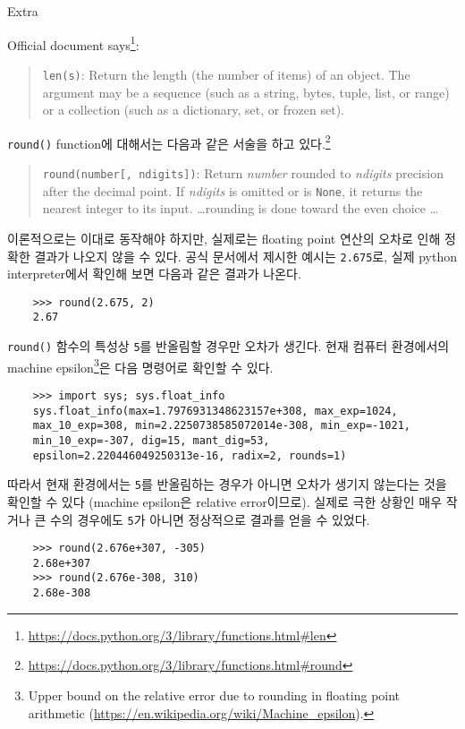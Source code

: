 \documentclass[a4paper,11pt]{scrartcl}
\begin{document}
\begin{labeling}{Extra}
  \item[Extra]
  Official document says\footnote{\url{https://docs.python.org/3/library/functions.html\#len}}:
  \begin{quotation}
    \lstinline{len(s)}: Return the length (the number of items) of an object. The argument may be a sequence (such as a string, bytes, tuple, list, or range) or a collection (such as a dictionary, set, or frozen set).
  \end{quotation}
  \lstinline{round()} function에 대해서는 다음과 같은 서술을 하고 있다.\footnote{\url{https://docs.python.org/3/library/functions.html\#round}}
  \begin{quotation}
    \lstinline{round(number[, ndigits])}: Return \emph{number} rounded to \emph{ndigits} precision after the decimal point. If \emph{ndigits} is omitted or is \lstinline{None}, it returns the nearest integer to its input. \dots rounding is done toward the even choice \dots
  \end{quotation}
  이론적으로는 이대로 동작해야 하지만, 실제로는 floating point 연산의 오차로 인해 정확한 결과가 나오지 않을 수 있다. 공식 문서에서 제시한 예시는 \lstinline{2.675}로, 실제 python interpreter에서 확인해 보면 다음과 같은 결과가 나온다.
  \begin{lstlisting}
    >>> round(2.675, 2)
    2.67
  \end{lstlisting}
  \lstinline{round()} 함수의 특성상 \lstinline{5}를 반올림할 경우만 오차가 생긴다. 현재 컴퓨터 환경에서의 machine epsilon\footnote{Upper bound on the relative error due to rounding in floating point arithmetic (\url{https://en.wikipedia.org/wiki/Machine_epsilon}).}은 다음 명령어로 확인할 수 있다.
  \begin{lstlisting}
    >>> import sys; sys.float_info
    sys.float_info(max=1.7976931348623157e+308, max_exp=1024,
    max_10_exp=308, min=2.2250738585072014e-308, min_exp=-1021,
    min_10_exp=-307, dig=15, mant_dig=53,
    epsilon=2.220446049250313e-16, radix=2, rounds=1)
  \end{lstlisting}
  따라서 현재 환경에서는 \lstinline{5}를 반올림하는 경우가 아니면 오차가 생기지 않는다는 것을 확인할 수 있다 (machine epsilon은 relative error이므로). 실제로 극한 상황인 매우 작거나 큰 수의 경우에도 \lstinline{5}가 아니면 정상적으로 결과를 얻을 수 있었다.
  \begin{lstlisting}
    >>> round(2.676e+307, -305)
    2.68e+307
    >>> round(2.676e-308, 310)
    2.68e-308
  \end{lstlisting}

\end{labeling}
\end{document}
